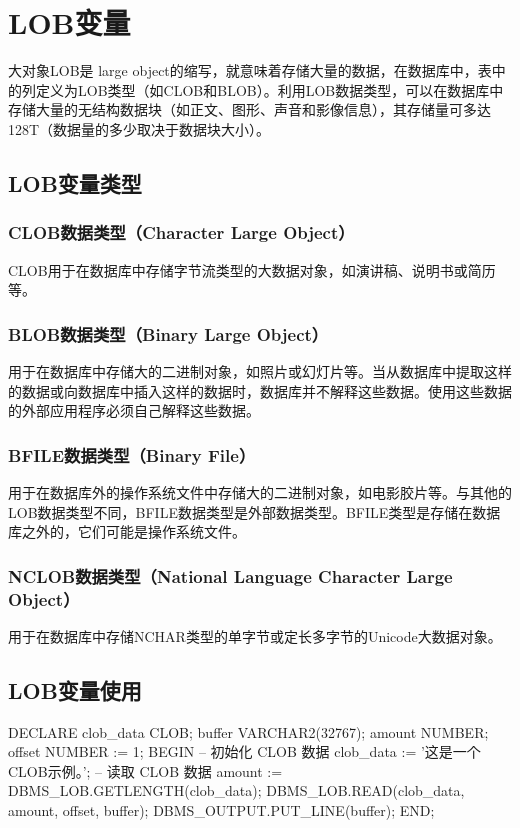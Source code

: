 \documentclass[11pt, a4paper, oneside, UTF8]{ctexbook}
\begin{document}
\section{LOB变量}
大对象LOB是 large object的缩写，就意味着存储大量的数据，在数据库中，表中的列定义为LOB类型（如CLOB和BLOB）。利用LOB数据类型，可以在数据库中存储大量的无结构数据块（如正文、图形、声音和影像信息），其存储量可多达128T（数据量的多少取决于数据块大小）。
\subsection{LOB变量类型}
\subsubsection{CLOB数据类型（Character Large Object）}
CLOB用于在数据库中存储字节流类型的大数据对象，如演讲稿、说明书或简历等。
\subsubsection{BLOB数据类型（Binary Large Object）}
用于在数据库中存储大的二进制对象，如照片或幻灯片等。当从数据库中提取这样的数据或向数据库中插入这样的数据时，数据库并不解释这些数据。使用这些数据的外部应用程序必须自己解释这些数据。
\subsubsection{BFILE数据类型（Binary File）}
用于在数据库外的操作系统文件中存储大的二进制对象，如电影胶片等。与其他的LOB数据类型不同，BFILE数据类型是外部数据类型。BFILE类型是存储在数据库之外的，它们可能是操作系统文件。
\subsubsection{NCLOB数据类型（National Language Character Large Object）}用于在数据库中存储NCHAR类型的单字节或定长多字节的Unicode大数据对象。
\subsection{LOB变量使用}
\begin{plsql}[caption=LOB变量使用示例代码]
DECLARE
  clob_data CLOB;
  buffer VARCHAR2(32767);
  amount NUMBER;
  offset NUMBER := 1;
BEGIN
  -- 初始化 CLOB 数据
  clob_data := '这是一个CLOB示例。';
  -- 读取 CLOB 数据
  amount := DBMS_LOB.GETLENGTH(clob_data);
  DBMS_LOB.READ(clob_data, amount, offset, buffer);
  DBMS_OUTPUT.PUT_LINE(buffer);
END;
\end{plsql}
\end{document}
